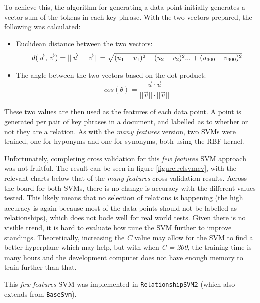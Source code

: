 To achieve this, the algorithm for generating a data point initially generates a vector sum of the tokens in each key phrase. With the two vectors prepared, the following was calculated:
\begin{itemize}
	\item Euclidean distance between the two vectors:
	\begin{equation*}
	d(\overrightarrow{u}, \overrightarrow{v}) = ||\overrightarrow{u} - \overrightarrow{v}|| = \sqrt{(u_1 - v_1)^2 + (u_2 - v_2)^2 ... + (u\textsubscript{300} - v\textsubscript{300})^2}
	\end{equation*}
	\item The angle between the two vectors based on the dot product:
	\begin{equation*}
	cos(\theta) = \dfrac{\overrightarrow{u} \cdot \overrightarrow{u}}{||\overrightarrow{v}|| \cdot ||\overrightarrow{v}||}
	\end{equation*}
\end{itemize}

These two values are then used as the features of each data point. A point is generated per pair of key phrases in a document, and labelled as to whether or not they are a relation. As with the \textit{many features} version, two SVMs were trained, one for hyponyms and one for synonyms, both using the RBF kernel.

Unfortunately, completing cross validation for this \textit{few features} SVM approach was not fruitful. The result can be seen in figure \ref{figure:relsvmcv}, with the relevant charts below that of the \textit{many features} cross validation results. Across the board for both SVMs, there is no change is accuracy with the different values tested. This likely means that no selection of relations is happening (the high accuracy is again because most of the data points should not be labelled as relationships), which does not bode well for real world tests. Given there is no visible trend, it is hard to evaluate how tune the SVM further to improve standings. Theoretically, increasing the \textit{C} value may allow for the SVM to find a better hyperplane which may help, but with when \textit{C = 200}, the training time is many hours and the development computer does not have enough memory to train further than that. 

This \textit{few features} SVM was implemented in \texttt{RelationshipSVM2} (which also extends from \texttt{BaseSvm}).
